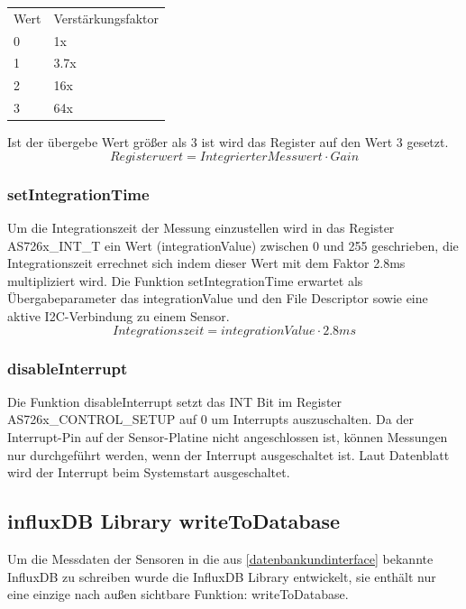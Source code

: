 \begin{tabular}{ l l}
 	Wert & Verstärkungsfaktor \\ 
 	0 & 1x \\  
 	1 & 3.7x \\
 	2 & 16x \\  
 	3 & 64x \\
\end{tabular}

Ist der übergebe Wert größer als 3 ist wird das Register auf den Wert 3 gesetzt.
\begin{equation}
	Registerwert = Integrierter Messwert \cdot Gain
\end{equation}

\subsubsection{setIntegrationTime}
Um die Integrationszeit der Messung einzustellen wird in das Register AS726x\_INT\_T ein Wert (integrationValue) zwischen 0 und 255 geschrieben, die Integrationszeit errechnet sich indem dieser Wert mit dem Faktor 2.8ms multipliziert wird.
Die Funktion setIntegrationTime erwartet als Übergabeparameter das integrationValue und den File Descriptor sowie eine aktive I2C-Verbindung zu einem Sensor.\\
\begin{equation}
	Integrationszeit = integrationValue\cdot2.8ms
\end{equation}

\subsubsection{disableInterrupt}
Die Funktion disableInterrupt setzt das INT Bit im Register AS726x\_CONTROL\_SETUP auf 0 um Interrupts auszuschalten.
Da der Interrupt-Pin auf der Sensor-Platine nicht angeschlossen ist, können Messungen nur durchgeführt werden, wenn der Interrupt ausgeschaltet ist.
Laut Datenblatt wird der Interrupt beim Systemstart ausgeschaltet.

\subsection{influxDB Library writeToDatabase}\label{influxDB-Library}
Um die Messdaten der Sensoren in die aus \ref{datenbankundinterface} bekannte InfluxDB zu schreiben wurde die InfluxDB Library entwickelt, sie enthält nur eine einzige nach außen sichtbare Funktion: writeToDatabase.
